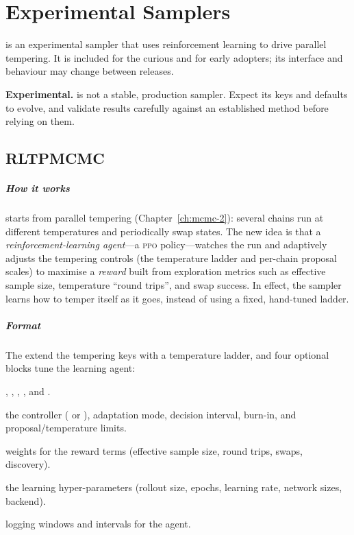 \chapter{Experimental Samplers}
\label{ch:experimental}

  is an experimental
sampler that uses reinforcement learning to drive parallel tempering. It is included for the
curious and for early adopters; its interface and behaviour may change between releases.

\begin{jwarn}
\textbf{Experimental.}  is not a stable, production sampler. Expect its keys and
defaults to evolve, and validate results carefully against an established method before relying on
them.
\end{jwarn}

\section{RLTPMCMC}
\label{sec:s-rltpmcmc}

\paragraph{How it works}  starts from parallel tempering (Chapter~\ref{ch:mcmc-2}):
several chains run at different temperatures and periodically swap states. The new idea is that a
\emph{reinforcement-learning agent}---a \textsc{ppo} policy---watches the run and adaptively adjusts
the tempering controls (the temperature ladder and per-chain proposal scales) to maximise a
\emph{reward} built from exploration metrics such as effective sample size, temperature
``round trips'', and swap success. In effect, the sampler learns how to temper itself as it goes,
instead of using a fixed, hand-tuned ladder.

\paragraph{Format} The  extend the tempering keys with a temperature ladder, and
four optional blocks tune the learning agent:

\begin{description}[style=nextline, leftmargin=1.2em]
  \item[\yamlkey{Bounds}] , , ,
        , and .
  \item[\yamlkey{Control}] the controller ( or ), adaptation mode, decision
        interval, burn-in, and proposal/temperature limits.
  \item[\yamlkey{Reward}] weights for the reward terms (effective sample size, round trips, swaps,
        discovery).
  \item[\yamlkey{PPO}] the learning hyper-parameters (rollout size, epochs, learning rate, network
        sizes, backend).
  \item[\yamlkey{Diagnostics}] logging windows and intervals for the agent.
\end{description}

